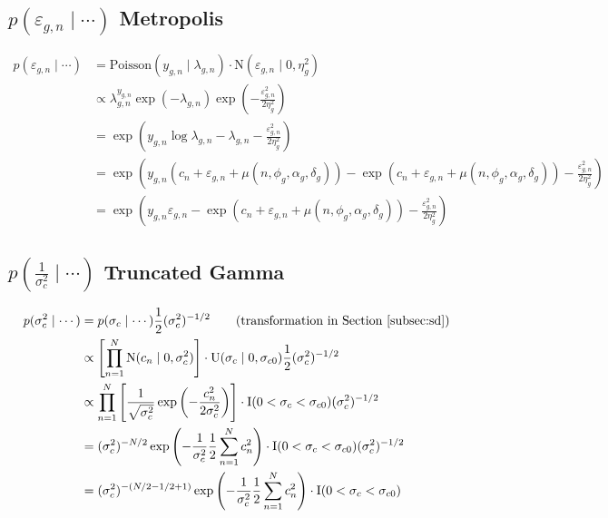 \documentclass{article}\usepackage{graphicx, color}
\providecommand{\e}{\varepsilon}
\begin{document}
\begin{flushleft}
\subsection{ $p(\e_{g, n} \mid \cdots)$ Metropolis}
 
 \begin{align*}
p(\e_{g, n} \mid \cdots) &= \text{Poisson}(y_{g, n} \mid \lambda_{g, n}) \cdot \text{N}(\e_{g, n} \mid 0, \eta_g^2) \\
&\propto \lambda_{g, n}^{y_{g, n}} \exp(- \lambda_{g,n}) \exp \left ( - \frac{\e_{g, n}^2}{2 \eta_g^2} \right ) \\
&= \exp \left (y_{g, n} \log \lambda_{g, n}- \lambda_{g,n}  - \frac{\e_{g, n}^2}{2 \eta_g^2} \right) \\
&= \exp \left (y_{g, n} (c_n + \e_{g, n} + \mu(n, \phi_g, \alpha_g, \delta_g))- \exp(c_n + \e_{g, n} + \mu(n, \phi_g, \alpha_g, \delta_g))  - \frac{\e_{g, n}^2}{2 \eta_g^2} \right) \\
&= \exp \left (y_{g, n} \e_{g, n} - \exp(c_n + \e_{g, n} + \mu(n, \phi_g, \alpha_g, \delta_g))  - \frac{\e_{g, n}^2}{2 \eta_g^2} \right)
\end{align*}

\subsection {$p \left ( \frac{1}{\sigma_c^2} \mid \cdots \right ) $ Truncated Gamma}

\begin{align*}
p( \sigma_c^2 \mid \cdots) &= p(\sigma_c \mid \cdots) \frac{1}{2} (\sigma_c^2)^{-1/2} \qquad \text{(transformation in Section \ref{subsec:sd})} \\
 &\propto \left [ \prod_{n = 1}^N \text{N}(c_n \mid 0, \sigma_c^2) \right ] \cdot \text{U}(\sigma_c \mid 0, \sigma_{c0}) \frac{1}{2} (\sigma_c^2)^{-1/2} \\
    &\propto \prod_{n = 1}^N \left [ \frac{1}{\sqrt{\sigma_c^2 }}\exp \left (- \frac{c_n^2}{2 \sigma_c^2} \right ) \right ] \cdot \text{I}(0 < \sigma_c < \sigma_{c0}) (\sigma_c^2)^{-1/2}\\
    &= (\sigma_c^2)^{-N/2} \exp \left ( - \frac{1}{\sigma_c^2}\frac{1}{2 } \sum_{n = 1}^N c_n^2 \right )\cdot \text{I}(0 < \sigma_c < \sigma_{c0}) (\sigma_c^2)^{-1/2} \\
&= (\sigma_c^2)^{-(N/2 -1/2 + 1)} \exp \left ( - \frac{1}{\sigma_c^2}\frac{1}{2 } \sum_{n = 1}^N c_n^2 \right )\cdot \text{I}(0 < \sigma_c < \sigma_{c0}) \\
 \end{align*}
 

\end{flushleft}
\end{document}
